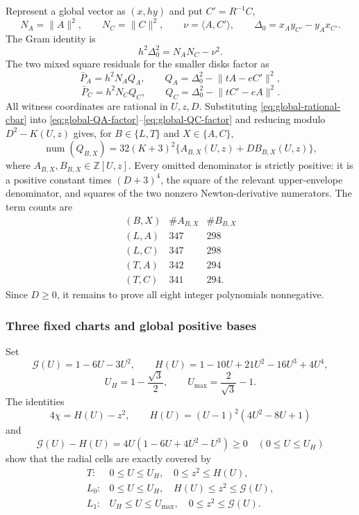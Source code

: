 Represent a global vector as $(x,hy)$ and put $C'=R^{-1}C$,
\[
 N_A=\lVert A\rVert^2,\qquad N_C=\lVert C\rVert^2,
 \qquad \nu=\langle A,C'\rangle,
 \qquad \Delta_0=x_Ay_{C'}-y_Ax_{C'}.
\]
The Gram identity is
\[
 h^2\Delta_0^2=N_AN_C-\nu^2.
\]
The two mixed square residuals for the smaller disks factor as
\begin{equation}
 \bar P_A=h^2N_AQ_A,
 \qquad Q_A=\Delta_0^2-\lVert tA-eC'\rVert^2,
 \label{eq:global-QA-factor}
\end{equation}
\begin{equation}
 \bar P_C=h^2N_CQ_C,
 \qquad Q_C=\Delta_0^2-\lVert tC'-eA\rVert^2.
 \label{eq:global-QC-factor}
\end{equation}
All witness coordinates are rational in $U,z,D$.  Substituting
\eqref{eq:global-rational-cbar} into
\eqref{eq:global-QA-factor}--\eqref{eq:global-QC-factor} and reducing modulo
$D^2-K(U,z)$ gives, for $B\in\{L,T\}$ and $X\in\{A,C\}$,
\begin{equation}
 \operatorname{num}(Q_{B,X})
 =32(K+3)^2\{A_{B,X}(U,z)+D B_{B,X}(U,z)\},
 \label{eq:global-core-reduction}
\end{equation}
where $A_{B,X},B_{B,X}\in\mathbb Z[U,z]$.  Every omitted denominator is
strictly positive: it is a positive constant times $(D+3)^4$, the square of
the relevant upper-envelope denominator, and squares of the two nonzero
Newton-derivative numerators.  The term counts are
\[
\begin{array}{c|cc}
(B,X)&\#A_{B,X}&\#B_{B,X}\\ \hline
(L,A)&347&298\\
(L,C)&347&298\\
(T,A)&342&294\\
(T,C)&341&294.
\end{array}
\]
Since $D\ge0$, it remains to prove all eight integer polynomials nonnegative.

\subsubsection{Three fixed charts and global positive bases}

Set
\[
 \mathcal G(U)=1-6U-3U^2,
 \qquad
 H(U)=1-10U+21U^2-16U^3+4U^4,
\]
\[
 U_H=1-\frac{\sqrt3}{2},
 \qquad U_{\max}=\frac2{\sqrt3}-1.
\]
The identities
\[
 4\chi=H(U)-z^2,
 \qquad
 H(U)=(U-1)^2(4U^2-8U+1)
\]
and
\[
 \mathcal G(U)-H(U)
 =4U(1-6U+4U^2-U^3)\ge0\quad(0\le U\le U_H)
\]
show that the radial cells are exactly covered by
\begin{equation}
\begin{array}{ll}
T:&0\le U\le U_H,\quad 0\le z^2\le H(U),\\[1mm]
L_0:&0\le U\le U_H,\quad H(U)\le z^2\le\mathcal G(U),\\[1mm]
L_1:&U_H\le U\le U_{\max},\quad 0\le z^2\le\mathcal G(U).
\end{array}
\label{eq:global-three-cells}
\end{equation}

